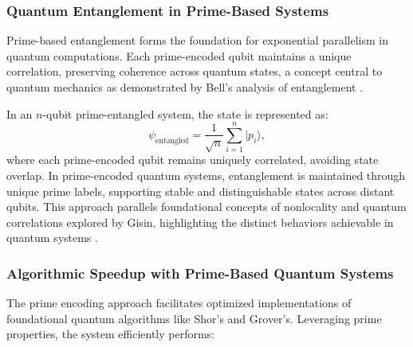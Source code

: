 \documentclass{article}
\newcommand{\primeQubit}[1]{|p_{#1}\rangle}
\begin{document}
\subsubsection{Quantum Entanglement in Prime-Based Systems}
Prime-based entanglement forms the foundation for exponential parallelism in quantum computations. Each prime-encoded qubit maintains a unique correlation, preserving coherence across quantum states, a concept central to quantum mechanics as demonstrated by Bell's analysis of entanglement \cite{bell1964}.

In an \( n \)-qubit prime-entangled system, the state is represented as:
\begin{equation}
    \psi_{\text{entangled}} = \frac{1}{\sqrt{n}} \sum_{i=1}^{n} \primeQubit{i},
\end{equation}
where each prime-encoded qubit remains uniquely correlated, avoiding state overlap. In prime-encoded quantum systems, entanglement is maintained through unique prime labels, supporting stable and distinguishable states across distant qubits. This approach parallels foundational concepts of nonlocality and quantum correlations explored by Gisin, highlighting the distinct behaviors achievable in quantum systems \cite{gisin2014}.

\subsubsection{Algorithmic Speedup with Prime-Based Quantum Systems}

The prime encoding approach facilitates optimized implementations of foundational quantum algorithms like Shor’s and Grover’s. Leveraging prime properties, the system efficiently performs:
\end{document}
